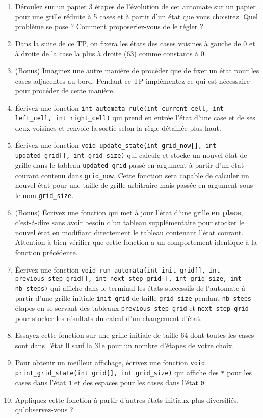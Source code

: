 \documentclass[11pt]{article}
\begin{document}
\begin{enumerate}
\item Déroulez sur un papier 3 étapes de l'évolution de cet automate sur un papier pour une grille réduite à 5 cases et à partir d'un état que vous choisirez. Quel problème se pose ? Comment proposeriez-vous de le régler ?
\item Dans la suite de ce TP, on fixera les états des cases voisines à gauche de 0 et à droite de la case la plus à droite (63) comme constants à 0.
\item (Bonus) Imaginez une autre manière de procéder que de fixer un état pour les cases adjacentes au bord. Pendant ce TP implémentez ce qui est nécessaire pour procéder de cette manière.
\item Écrivez une fonction \texttt{int automata\_rule(int current\_cell, int left\_cell, int right\_cell)} qui prend en entrée l'état d'une case et de ses deux voisines et renvoie la sortie selon la règle détaillée plus haut.
\item Écrivez une fonction \texttt{void update\_state(int grid\_now[], int updated\_grid[], int grid\_size)} qui calcule et stocke un nouvel état de grille dans le tableau \texttt{updated\_grid} passé en argument à partir d'un état courant contenu dans \texttt{grid\_now}. Cette fonction sera capable de calculer un nouvel état pour une taille de grille arbitraire mais passée en argument sous le nom \texttt{grid\_size}.
\item (Bonus) Écrivez une fonction qui met à jour l'état d'une grille \textbf{en place}, c'est-à-dire sans avoir besoin d'un tableau supplémentaire pour stocker le nouvel état en modifiant directement le tableau contenant l'état courant. Attention à bien vérifier que cette fonction a un comportement identique à la fonction précédente.
\item Écrivez une fonction \texttt{void run\_automata(int init\_grid[], int previous\_step\_grid[], int next\_step\_grid[], int grid\_size, int nb\_steps)} qui affiche dans le terminal les états successifs de l'automate à partir d'une grille initiale \texttt{init\_grid} de taille \texttt{grid\_size} pendant \texttt{nb\_steps} étapes en se servant des tableaux \texttt{previous\_step\_grid} et \texttt{next\_step\_grid} pour stocker les résultats du calcul d'un changement d'état.
\item Essayez cette fonction sur une grille initiale de taille 64 dont toutes les cases sont dans l'état 0 sauf la 31e pour un nombre d'étapes de votre choix.
\item Pour obtenir un meilleur affichage, écrivez une fonction \texttt{void print\_grid\_state(int grid[], int grid\_size)} qui affiche des \texttt{*} pour les cases dans l'état \texttt{1} et des espaces pour les cases dans l'état \texttt{0}.
\item Appliquez cette fonction à partir d'autres états initiaux plus diversifiés, qu'observez-vous ?
\end{enumerate}
\end{document}
